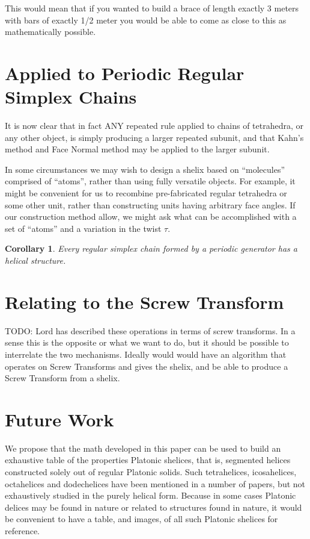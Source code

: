 \documentclass[11pt]{article}
\newtheorem{corollary}{Corollary}
\begin{document}
{This would mean that if you wanted to build a brace of length exactly 3 meters
with bars of exactly 1/2 meter you would be able to come as close to this
as mathematically possible.


\section{Applied to Periodic Regular Simplex Chains}

It is now clear that in fact ANY repeated rule applied to chains of tetrahedra, or any other object,
is simply producing a larger repeated subunit, and that Kahn's method and Face Normal method
may be applied to the larger subunit.

In some circumstances we may wish to design a shelix based on ``molecules'' comprised of ``atoms'',
rather than using fully versatile objects. For example, it might be convenient for us to
recombine pre-fabricated regular tetrahedra or some other unit, rather than constructing
units having arbitrary face angles. If our construction method allow, we might ask
what can be accomplished with a set of ``atoms'' and a variation in the twist $\tau$\cite{elgersma2016quadrahelix}.

\begin{corollary}
  Every regular simplex chain formed by a periodic generator has a helical structure.
  \end{corollary}

\section{Relating to the Screw Transform}

TODO: Lord has described these operations in terms of screw transforms. In a sense this is the opposite or what we want to do, but it should be possible to interrelate
the two mechanisms. Ideally would would have an algorithm that operates on Screw Transforms and gives the shelix, and be able to produce a Screw Transform
from a shelix.

\section{Future Work}

We propose that the math developed in this paper can be used to build an exhaustive table of the properties {Platonic shelices},
that is, segmented helices constructed solely out of regular Platonic solids. Such tetrahelices, icosahelices, octahelices and dodechelices
have been mentioned in a number of papers\cite{elgersma2016quadrahelix,babiker2012combinatorial,lord2001sphere}, but not exhaustively studied in the purely helical form. Because in some cases Platonic delices may be found in nature or related to structures found in nature\cite{lord2004gamma},
it would be convenient to have a table, and images, of all such Platonic shelices for reference.



}
\end{document}

